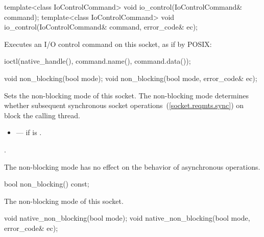 \begin{itemdecl}
template<class IoControlCommand>
  void io_control(IoControlCommand& command);
template<class IoControlCommand>
  void io_control(IoControlCommand& command, error_code& ec);
\end{itemdecl}

\begin{itemdescr}
\pnum
\effects Executes an I/O control command on this socket, as if by POSIX:
\begin{codeblock}
ioctl(native_handle(), command.name(), command.data());
\end{codeblock}
\end{itemdescr}

\begin{itemdecl}
void non_blocking(bool mode);
void non_blocking(bool mode, error_code& ec);
\end{itemdecl}

\begin{itemdescr}
\pnum
\effects Sets the non-blocking mode of this socket. The non-blocking mode determines whether subsequent synchronous socket operations~(\ref{socket.reqmts.sync}) on  block the calling thread.

\pnum
\errors
\begin{itemize}
\item
{} --- if  is .
\end{itemize}

\pnum
\postconditions {}.

\pnum
 \begin{note} The non-blocking mode has no effect on the behavior of asynchronous operations. \end{note}
\end{itemdescr}

\begin{itemdecl}
bool non_blocking() const;
\end{itemdecl}

\begin{itemdescr}
\pnum
\returns The non-blocking mode of this socket.
\end{itemdescr}

\begin{itemdecl}
void native_non_blocking(bool mode);
void native_non_blocking(bool mode, error_code& ec);
\end{itemdecl}

